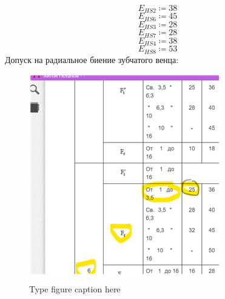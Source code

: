\documentclass{article}
\newcommand{\defeq}{\coloneq} %
\begin{document}
\begin{equation*}
\textit{E}_{\textit{HS2}} \defeq 38
\end{equation*}
\begin{equation*}
\textit{E}_{\textit{HS6}} \defeq 45
\end{equation*}
\begin{equation*}
\textit{E}_{\textit{HS3}} \defeq 28
\end{equation*}
\begin{equation*}
\textit{E}_{\textit{HS7}} \defeq 28
\end{equation*}
\begin{equation*}
\textit{E}_{\textit{HS4}} \defeq 38
\end{equation*}
\begin{equation*}
\textit{E}_{\textit{HS8}} \defeq 53
\end{equation*}
\colorbox[HTML]{000000}{Допуск на радиальное биение зубчатого венца:}\newline
\begin{figure}[h!]
 \begin{center}
  \includegraphics[max width=\textwidth]{calculations/846.png}
  \caption{Type figure caption here}
  \label{fig:846}
 \end{center}
\end{figure}
\end{document}
